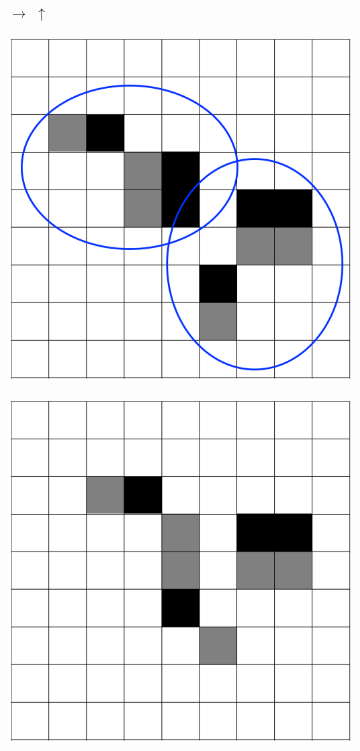 \documentclass[12pt]{article}
\numberwithin{figure}{section} %
\begin{document}
\begin{figure}[H]
	\begin{subfigure}[t]{0.06\textwidth}
	\centering
		{\LARGE$\xrightarrow{}$}
		{\LARGE$\uparrow{}$}
  	\end{subfigure}	
	\begin{subfigure}{0.22\textwidth}
     		\centering
     		\includegraphics[width=\linewidth]{Section4/32.0}
     		\subcaption{}
   	\end{subfigure}
    	\begin{subfigure}{0.22\textwidth}
     		\centering
     		\includegraphics[width=\linewidth]{Section4/32.1}

\end{subfigure}
\end{figure}
\end{document}
